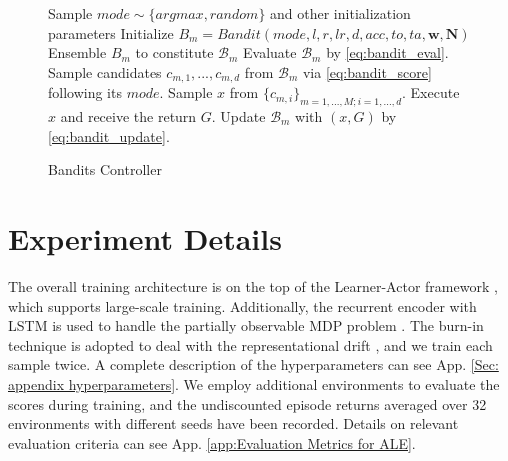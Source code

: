 \begin{figure}[ht]
  \centering
  \begin{minipage}{.9\linewidth}
    \begin{algorithm}[H]
      \caption{Bandits Controller}  
          \begin{algorithmic}
                \STATE Sample $mode \sim \{argmax, random\}$ and other initialization parameters
                \STATE Initialize $B_m = Bandit(mode, l, r, lr, d, acc, to, ta, \textbf{w}, \textbf{N})$
                \STATE Ensemble $B_m$ to constitute $\mathcal{B}_m$ 
            \ENDFOR
                    \STATE Evaluate $\mathcal{B}_m$ by \eqref{eq:bandit_eval}.
                    \STATE Sample candidates $c_{m, 1}, ..., c_{m, d}$  from $\mathcal{B}_m$ via \eqref{eq:bandit_score} following its $mode$.
                \ENDFOR
                \STATE Sample $x$ from $\{c_{m, i}\}_{m=1,...,M; i=1,...,d}$.
                \STATE Execute $x$ and receive the return $G$.
                    \STATE Update $\mathcal{B}_m$ with $(x, G)$ by \eqref{eq:bandit_update}.
                \ENDFOR
            \ENDWHILE
          \end{algorithmic}  
        \label{alg:bva}
    \end{algorithm}
  \end{minipage}
\end{figure}


\clearpage


\section{Experiment Details}
\label{sec:app Experiment Details}

The overall training architecture is on the top of the Learner-Actor  framework \citep{impala}, which supports large-scale training. Additionally, the recurrent encoder with LSTM \citep{lstm} is used to handle the partially observable MDP problem \citep{ale}. 
The burn-in technique is adopted to deal with the representational drift \citep{r2d2}, and we train each sample twice.
A complete description of the hyperparameters  can see App. \ref{Sec: appendix hyperparameters}. 
We employ additional environments to evaluate the scores during training, and the undiscounted episode returns averaged over 32 environments with different seeds have been recorded. 
Details on relevant evaluation criteria  can see App. \ref{app:Evaluation Metrics for ALE}.
 
